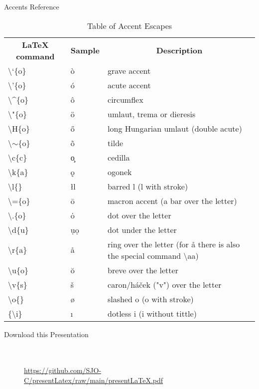 \documentclass{beamer}
\begin{document}
\begin{frame}{Accents Reference}
\tiny{
\begin{table}[]
\begin{tabular}{lll}
\multicolumn{1}{c}{\textbf{LaTeX command}} & \multicolumn{1}{c}{\textbf{Sample}} & \multicolumn{1}{c}{\textbf{Description}} \\
\textbackslash{}`\{o\} & \`{o} & grave accent \\
\textbackslash{}'\{o\} & \'{o} & acute accent \\
\textbackslash{}\textasciicircum{}\{o\} & \^{o} & circumflex \\
\textbackslash{}"\{o\} & \"{o} & umlaut, trema or dieresis \\
\textbackslash{}H\{o\} & \H{o} & long Hungarian umlaut (double acute) \\
\textbackslash{}$\sim$\{o\} & \~{o} & tilde \\
\textbackslash{}c\{c\} &\c{o} & cedilla \\
\textbackslash{}k\{a\} & \k{o} & ogonek \\
\textbackslash{}l\{\} & \l{l} & barred l (l with stroke) \\
\textbackslash{}=\{o\} & \={o} & macron accent (a bar over the letter) \\
\textbackslash{}.\{o\} & \.{o} & dot over the letter \\
\textbackslash{}d\{u\} & ụ\d{o}& dot under the letter \\
\textbackslash{}r\{a\} & \r{a} & ring over the letter (for å there is also the special command \textbackslash{}aa) \\
\textbackslash{}u\{o\} & \u{o} & breve over the letter \\
\textbackslash{}v\{s\} & \v{s} & caron/háček ("v") over the letter \\
\textbackslash{}o\{\} & \o{} & slashed o (o with stroke) \\
\{\textbackslash{}i\} & \i{} & dotless i (i without tittle)
\end{tabular}
\caption{Table of Accent Escapes}
\label{tabAccentChars}
\end{table}}%
\end{frame}

\begin{frame}{Download this Presentation}
\begin{centering}
\begin{figure}[h]
\\~\\
\url{https://github.com/SJO-C/presentLatex/raw/main/presentLaTeX.pdf}
\label{qrandLinkforPresent}
\end{figure}
\end{centering}
\end{frame}
\end{document}
